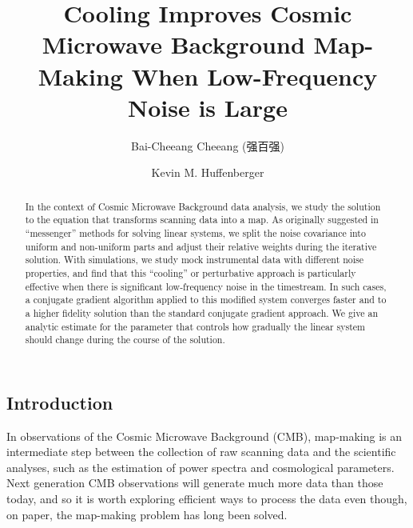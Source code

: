 \documentclass[twocolumn,linenumbers]{aastex631}
\begin{document}
\begin{CJK*}{UTF8}{gbsn}

\title{Cooling Improves Cosmic Microwave Background Map-Making When Low-Frequency Noise is Large}


\author{Bai-Cheeang Cheeang (强百强)} 

\author[0000-0001-7109-0099]{Kevin M. Huffenberger}

 
\begin{abstract}

In the context of Cosmic Microwave Background data analysis, we study the solution to the equation that transforms scanning data into a map.
As originally suggested in ``messenger'' methods for solving linear systems, we split the  noise covariance into uniform and non-uniform parts and adjust their relative weights during the iterative solution.
With simulations, we study mock instrumental data with different noise properties, and find that this ``cooling'' or perturbative approach is particularly effective when there is significant low-frequency noise in the timestream.  In such cases, a conjugate gradient algorithm applied to this modified system converges faster and to a higher fidelity solution than the standard conjugate gradient approach. %
We give an analytic estimate for the parameter that controls how gradually the linear system should change during the course of the solution.

\end{abstract}


\section{Introduction} \label{sec:intro}


In observations of the Cosmic Microwave Background (CMB), map-making is an intermediate step between the collection of raw scanning data and the scientific analyses, such as the estimation of power spectra and cosmological parameters.
Next generation CMB observations will generate much more data than those today, and so
it is worth exploring efficient ways to process the data even though, on paper, the map-making problem has long been solved.


\end{CJK*}
\end{document}
